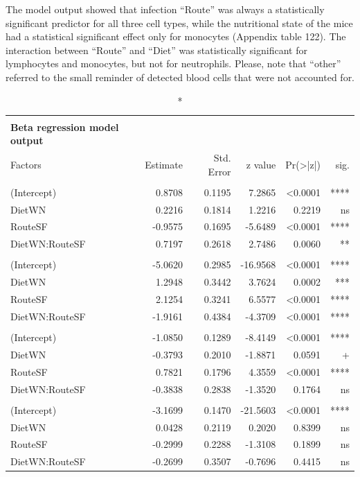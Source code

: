 \documentclass[
  12pt,
  letterpaper,
]{article}
\begin{document}
The model output showed that infection ``Route'' was always a statistically significant predictor for all three cell types, while the nutritional state of the mice had a statistical significant effect only for monocytes (Appendix table 122). The interaction between ``Route'' and ``Diet'' was statistically significant for lymphocytes and monocytes, but not for neutrophils. Please, note that ``other'' referred to the small reminder of detected blood cells that were not accounted for.

\begingroup
\fontsize{12.0pt}{14.4pt}\selectfont
\begin{longtable}{l|rrrrr}
\caption*{
{\large \textbf{Appendix Table 122}} \\ 
{\small \textbf{Beta regression model output}}
} \\ 
\toprule
Factors & {Estimate} & {Std. Error} & {z value} & {Pr(>|z|)} & {sig.} \\ 
\midrule\addlinespace[2.5pt]
\multicolumn{6}{l}{Lymphocytes} \\[2.5pt] 
\midrule\addlinespace[2.5pt]
(Intercept) & 0.8708 & 0.1195 & 7.2865 & <0.0001 & **** \\ 
DietWN & 0.2216 & 0.1814 & 1.2216 & 0.2219 & ns \\ 
RouteSF & -0.9575 & 0.1695 & -5.6489 & <0.0001 & **** \\ 
DietWN:RouteSF & 0.7197 & 0.2618 & 2.7486 & 0.0060 & ** \\ 
\midrule\addlinespace[2.5pt]
\multicolumn{6}{l}{Monocytes} \\[2.5pt] 
\midrule\addlinespace[2.5pt]
(Intercept) & -5.0620 & 0.2985 & -16.9568 & <0.0001 & **** \\ 
DietWN & 1.2948 & 0.3442 & 3.7624 & 0.0002 & *** \\ 
RouteSF & 2.1254 & 0.3241 & 6.5577 & <0.0001 & **** \\ 
DietWN:RouteSF & -1.9161 & 0.4384 & -4.3709 & <0.0001 & **** \\ 
\midrule\addlinespace[2.5pt]
\multicolumn{6}{l}{Neutrophils} \\[2.5pt] 
\midrule\addlinespace[2.5pt]
(Intercept) & -1.0850 & 0.1289 & -8.4149 & <0.0001 & **** \\ 
DietWN & -0.3793 & 0.2010 & -1.8871 & 0.0591 & + \\ 
RouteSF & 0.7821 & 0.1796 & 4.3559 & <0.0001 & **** \\ 
DietWN:RouteSF & -0.3838 & 0.2838 & -1.3520 & 0.1764 & ns \\ 
\midrule\addlinespace[2.5pt]
\multicolumn{6}{l}{Other} \\[2.5pt] 
\midrule\addlinespace[2.5pt]
(Intercept) & -3.1699 & 0.1470 & -21.5603 & <0.0001 & **** \\ 
DietWN & 0.0428 & 0.2119 & 0.2020 & 0.8399 & ns \\ 
RouteSF & -0.2999 & 0.2288 & -1.3108 & 0.1899 & ns \\ 
DietWN:RouteSF & -0.2699 & 0.3507 & -0.7696 & 0.4415 & ns \\ 
\bottomrule
\end{longtable}
\endgroup
\end{document}

